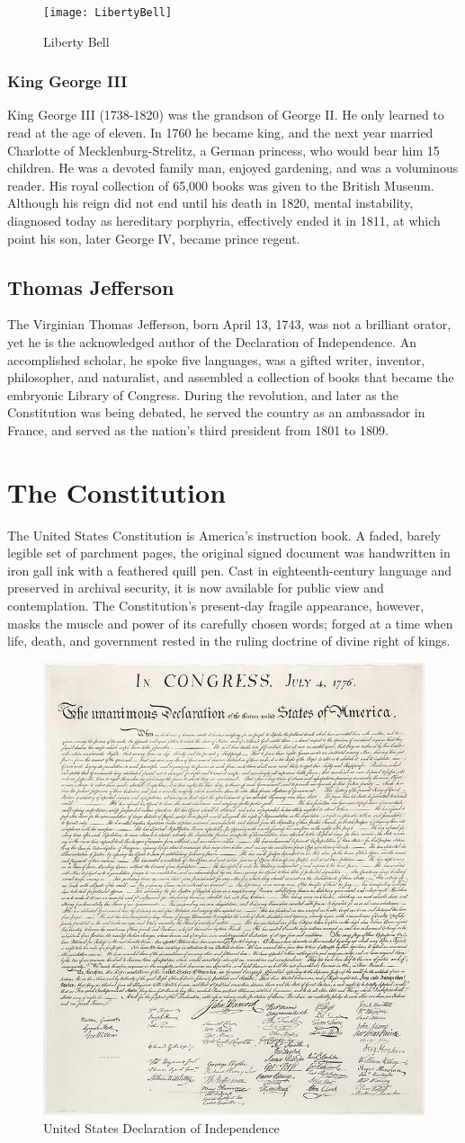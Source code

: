 \documentclass{report}
\begin{document}
\begin{figure}
\centering
\texttt{[image: LibertyBell]}
\caption{Liberty Bell}
\label{bell}
\end{figure}

\subsubsection{King George III} \label{george3}
King George III (1738-1820) was the grandson of George 
II. He only learned to read at the age of eleven. In 1760 
he became king, and the next year married Charlotte 
of Mecklenburg-Strelitz, a German princess, who would 
bear him 15 children. He was a devoted family man, 
enjoyed gardening, and was a voluminous reader. His 
royal collection of 65,000 books was given to the British 
Museum. Although his reign did not end until his death 
in 1820, mental instability, diagnosed today as hereditary 
porphyria, effectively ended it in 1811, at which point 
his son, later George IV, became prince regent.

\subsection{Thomas Jefferson}
The Virginian Thomas Jefferson, born April 13, 1743, was 
not a brilliant orator, yet he is the acknowledged author of 
the Declaration of Independence. An accomplished scholar, 
he spoke five languages, was a gifted writer, inventor, 
philosopher, and naturalist, and assembled a collection 
of books that became the embryonic Library of Congress. 
During the revolution, and later as the Constitution was 
being debated, he served the country as an ambassador in 
France, and served as the nation’s third president from 1801 
to 1809.

\section{The Constitution}
The United States Constitution is America’s instruction book. A faded, barely legible set of parchment 
pages, the original signed document was handwritten in iron gall ink with a feathered quill pen. Cast in 
eighteenth-century language and preserved in archival security, it is now available for public view and 
contemplation. The Constitution’s present-day fragile appearance, however, masks the muscle and power of its 
carefully chosen words; forged at a time when life, death, and government rested in the ruling doctrine of divine 
right of kings.

\begin{figure}[h]
\centering
\includegraphics[width=0.3\linewidth]{UnitedStatesDeclarationofIndependence}
\caption{United States Declaration of Independence}
\end{figure}
\end{document}
